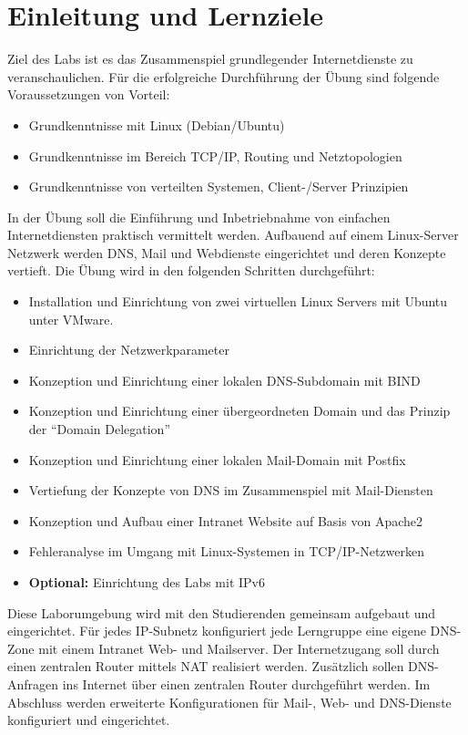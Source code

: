 \section{Einleitung und Lernziele}
Ziel des Labs ist es das Zusammenspiel grundlegender Internetdienste zu
veranschaulichen. Für die erfolgreiche Durchführung der Übung sind folgende
Voraussetzungen von Vorteil:
\begin{itemize}
  \item Grundkenntnisse mit Linux (Debian/Ubuntu)
  \item Grundkenntnisse im Bereich TCP/IP, Routing und Netztopologien
  \item Grundkenntnisse von verteilten Systemen, Client-/Server Prinzipien
\end{itemize}

In der Übung soll die Einführung und Inbetriebnahme von einfachen
Internetdiensten praktisch vermittelt werden. Aufbauend auf einem Linux-Server
Netzwerk werden DNS, Mail und Webdienste eingerichtet und deren Konzepte
vertieft. Die Übung wird in den folgenden Schritten durchgeführt:
\begin{itemize}
  \item Installation und Einrichtung von zwei virtuellen Linux Servers mit
  Ubuntu unter VMware.
  \item Einrichtung der Netzwerkparameter
  \item Konzeption und Einrichtung einer lokalen DNS-Subdomain mit BIND
  \item Konzeption und Einrichtung einer übergeordneten Domain und das Prinzip
  der "`Domain Delegation"'
  \item Konzeption und Einrichtung einer lokalen Mail-Domain mit Postfix
  \item Vertiefung der Konzepte von DNS im Zusammenspiel mit Mail-Diensten
  \item Konzeption und Aufbau einer Intranet Website auf Basis von Apache2
  \item Fehleranalyse im Umgang mit Linux-Systemen in TCP/IP-Netzwerken
  \item {\bf Optional:} Einrichtung des Labs mit IPv6
\end{itemize}

Diese Laborumgebung wird mit den Studierenden gemeinsam aufgebaut und
eingerichtet. Für jedes IP-Subnetz konfiguriert jede Lerngruppe eine eigene
DNS-Zone mit einem Intranet Web- und Mailserver. Der Internetzugang soll durch
einen zentralen Router mittels NAT realisiert werden. Zusätzlich sollen
DNS-Anfragen ins Internet über einen zentralen Router durchgeführt werden. Im
Abschluss werden erweiterte Konfigurationen für Mail-, Web- und DNS-Dienste
konfiguriert und eingerichtet.

